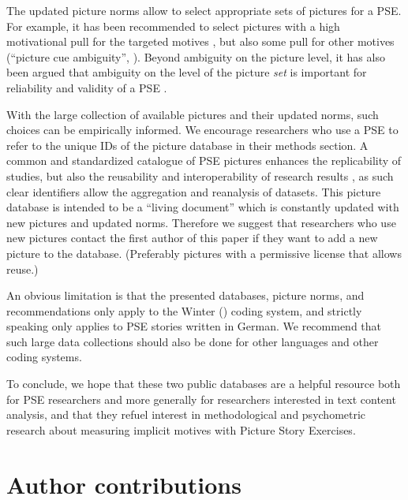 \documentclass[jou,a4paper]{apa6}\usepackage[]{graphicx}\usepackage[]{color}
\begin{document}
The updated picture norms allow to select appropriate sets of pictures for a PSE. For example, it has been recommended to select pictures with a high motivational pull for the targeted motives \parencite{schultheiss_MeasuringImplicitMotives_2007,smith_MethodologicalConsiderationsSteps_1992}, but also some pull for other motives (``picture cue ambiguity'', ). Beyond ambiguity on the picture level, it has also been argued that ambiguity on the level of the picture \emph{set} is important for reliability and validity of a PSE \parencite{ramsay_SetAmbiguityKey_2013}. 

With the large collection of available pictures and their updated norms, such choices can be empirically informed. We encourage researchers who use a PSE to refer to the unique IDs of the picture database in their methods section. A common and standardized catalogue of PSE pictures enhances the replicability of studies, but also the reusability and interoperability of research results \parencite{wilkinson_FAIRGuidingPrinciples_2016}, as such clear identifiers allow the aggregation and reanalysis of datasets. 
This picture database is intended to be a ``living document'' which is constantly updated with new pictures and updated norms. Therefore we suggest that researchers who use new pictures contact the first author of this paper if they want to add a new picture to the database. (Preferably pictures with a permissive license that allows reuse.) 

An obvious limitation is that the presented databases, picture norms, and recommendations only apply to the Winter (\citeyear{winter_ManualScoringMotive_1994}) coding system, and strictly speaking only applies to PSE stories written in German. We recommend that such large data collections should also be done for other languages and other coding systems.

To conclude, we hope that these two public databases are a helpful resource both for PSE researchers and more generally for researchers interested in text content analysis, and that they refuel interest in methodological and psychometric research about measuring implicit motives with Picture Story Exercises.

\section{Author contributions}
\end{document}
